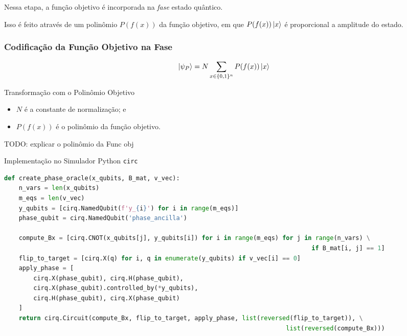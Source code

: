 \documentclass[aspectratio=169]{beamer}
\begin{document}
\begin{frame}
  Nessa etapa, a função objetivo é incorporada na \textit{fase} estado quântico. 

  \vfill

  Isso é feito através de um polinômio $P(f(x))$ da função objetivo, em que $P(f(x))\ket{x}$ é proporcional a amplitude do estado.

  \frametitle{Codificação da Função Objetivo na Fase}
  \[
      \ket{\psi_P}=N \sum_{x\in\{0,1\}^n}P(f(x))\ket{x}
  \]
  \begin{block}{Transformação com o Polinômio Objetivo}
      \begin{itemize}
          \item $N$ é a constante de normalização; e
          \item $P(f(x))$ é o polinômio da função objetivo.
      \end{itemize}
  \end{block}

  TODO: explicar o polinômio da Func obj
\end{frame}

\begin{frame}[fragile]
  
  \begin{block}{Implementação no Simulador Python \lstinline|circ|}
  \begin{lstlisting}[language=Python, frame=single, basicstyle=\tiny]
def create_phase_oracle(x_qubits, B_mat, v_vec):
    n_vars = len(x_qubits)
    m_eqs = len(v_vec)
    y_qubits = [cirq.NamedQubit(f'y_{i}') for i in range(m_eqs)]
    phase_qubit = cirq.NamedQubit('phase_ancilla')
    
    compute_Bx = [cirq.CNOT(x_qubits[j], y_qubits[i]) for i in range(m_eqs) for j in range(n_vars) \
                                                                                    if B_mat[i, j] == 1]
    flip_to_target = [cirq.X(q) for i, q in enumerate(y_qubits) if v_vec[i] == 0]
    apply_phase = [
        cirq.X(phase_qubit), cirq.H(phase_qubit),
        cirq.X(phase_qubit).controlled_by(*y_qubits),
        cirq.H(phase_qubit), cirq.X(phase_qubit)
    ]
    return cirq.Circuit(compute_Bx, flip_to_target, apply_phase, list(reversed(flip_to_target)), \
                                                                             list(reversed(compute_Bx)))
  \end{lstlisting}
  \end{block}
\end{frame}
\end{document}
